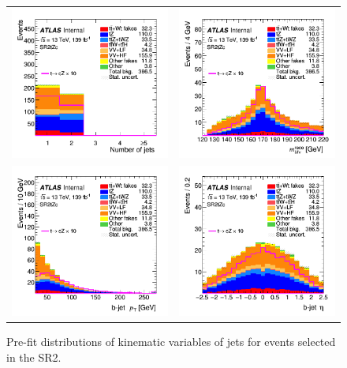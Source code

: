 \begin{figure}[]
	\centering
	\begin{tabular}{cc}
		\includegraphics[width=.35\textwidth]{Appendices/AP5/figures/SR2/nJets} &
		\includegraphics[width=.35\textwidth]{Appendices/AP5/figures/SR2/tSM} \\
		\includegraphics[width=.35\textwidth]{Appendices/AP5/figures/SR2/b_pt} & 
		\includegraphics[width=.35\textwidth]{Appendices/AP5/figures/SR2/b_eta} \\
	\end{tabular}
	\caption{Pre-fit distributions of kinematic variables of jets for events selected in the SR2\tZc.
		\ErrStatOnly
		\Blinded
	}%
	\label{fig:sel:sr2:jets}
\end{figure}

